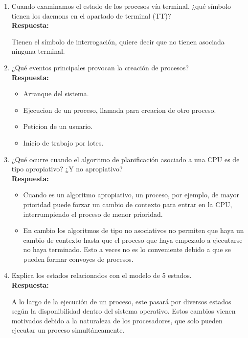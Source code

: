 \documentclass[a4paper,12pt]{article}
\begin{document}
\begin{enumerate}[label=\textbf{Pregunta \arabic*.}]
    \item Cuando examinamos el estado de los procesos vía terminal, ¿qué símbolo tienen los daemons en el apartado de terminal (TT)? \\ %
    \textbf{Respuesta:}

    Tienen el símbolo de interrogación, quiere decir que no tienen asociada ninguna terminal.



    \item ¿Qué eventos principales provocan la creación de procesos? \\ %
    \textbf{Respuesta:}

    \begin{itemize}
        \item Arranque del sistema.
        \item Ejecucion de un proceso, llamada para creacion de otro proceso.
        \item Peticion de un usuario.
        \item Inicio de trabajo por lotes.
    \end{itemize}

    \item ¿Qué ocurre cuando el algoritmo de planificación asociado a una CPU es de tipo apropiativo? ¿Y no apropiativo? \\ %
    \textbf{Respuesta:}

    \begin{itemize}
         
    \item Cuando es un algoritmo apropiativo, un proceso, por ejemplo, de mayor prioridad puede forzar un cambio de contexto para entrar en la CPU, interrumpiendo el proceso de menor prioridad.

    \item En cambio los algoritmos de tipo no asociativos no permiten que haya un cambio de contexto hasta que el proceso que haya empezado a ejecutarse no haya terminado. Esto a veces no es lo conveniente debido a que se pueden formar convoyes de procesos.

    \end{itemize}
    \newpage

    \item Explica los estados relacionados con el modelo de 5 estados. \\ %
    \textbf{Respuesta:}


    A lo largo de la ejecución de un proceso, este pasará por diversos estados según la disponibilidad dentro del sistema operativo. Estos cambios vienen motivados debido a la naturaleza de los procesadores, que solo pueden ejecutar un proceso simultáneamente.


\end{enumerate}
\end{document}
